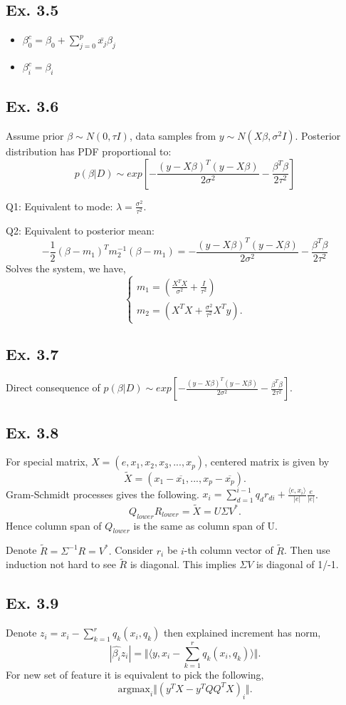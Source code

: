 \subsection*{Ex. 3.5}
\begin{itemize}
    \item $\beta_0^c = \beta_0 + \sum_{j=0}^p\bar{x_j}\beta_j$
    \item $\beta_i^c = \beta_i$
\end{itemize}

\subsection*{Ex. 3.6}
Assume prior $\beta \sim N(0, \tau I)$, data samples from $y\sim N(X\beta, \sigma^2 I)$. Posterior distribution has PDF proportional to:
$$p(\beta|D) \sim  exp\left[-\frac{(y-X\beta)^T(y-X\beta)}{2\sigma^2}-\frac{\beta^T\beta}{2\tau^2}\right]$$

Q1: Equivalent to mode: $\lambda = \frac{\sigma^2}{\tau^2}.$

Q2: Equivalent to posterior mean:
$$-\frac{1}{2}(\beta - m_1)^Tm_2^{-1}(\beta - m_1) = -\frac{(y-X\beta)^T(y-X\beta)}{2\sigma^2}-\frac{\beta^T\beta}{2\tau^2}$$
Solves the system, we have,
\[
    \begin{cases}
       m_1=(\frac{X^TX}{\sigma^2} + \frac{I}{\tau^2})\\
       m_2=(X^TX + \frac{\sigma^2}{\tau^2}X^Ty).
    \end{cases}
\]

\subsection*{Ex. 3.7}
Direct consequence of $p(\beta|D) \sim  exp\left[-\frac{(y-X\beta)^T(y-X\beta)}{2\sigma^2}-\frac{\beta^T\beta}{2\tau^2}\right]$.

\subsection*{Ex. 3.8} 
For special matrix, $X=(e, x_1, x_2, x_3,... , x_p)$, centered matrix is given by 
$$\widetilde{X} = (x_1 - \overline{x_1}, ..., x_p - \overline{x_p}).$$
Gram-Schmidt processes gives the following.
$x_i = \sum_{d=1}^{i - 1}q_{d}r_{di} + \frac{\langle e, x_i \rangle}{|e|}\frac{e}{|e|}$.
$$Q_{lower}R_{lower} = \widetilde{X} = U\Sigma V^{*}.$$
Hence column span of $Q_{lower}$ is the same as column span of U. 

Denote $\tilde{R} = \Sigma^{-1} R =  V^{*}.$ Consider $r_i$ be $i$-th column vector of $\tilde{R}$. Then use induction not hard to see $\tilde{R}$ is diagonal. This implies $\Sigma V$ is diagonal of 1/-1.

\subsection*{Ex. 3.9}
Denote $z_{i} = x_{i} - \sum_{k=1}^r q_{k}( x_{i}, q_{k})$ then explained increment has norm,
$$|\hat{\beta_{i}}z_{i}| = \Vert\langle y, x_{i} - \sum_{k=1}^r q_{k} (x_{i}, q_{k}) \rangle\Vert.$$
For new set of feature it is equivalent to pick the following,
$$\mbox{argmax}_{i}\Vert (y^T X - y^TQQ^{T}X)_{i}\Vert.$$
